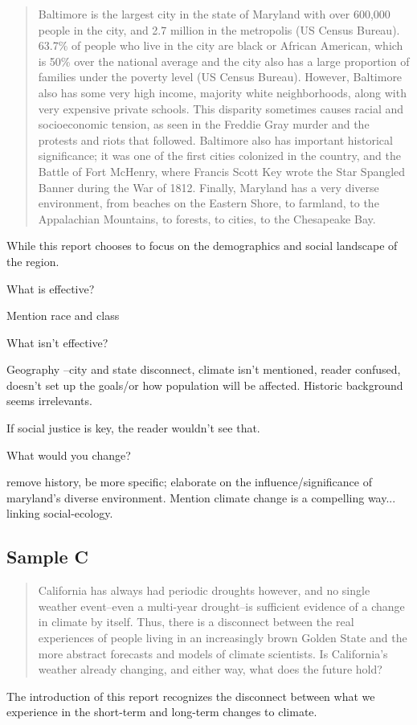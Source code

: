 \documentclass{article}\usepackage[]{graphicx}\usepackage[]{color}
\begin{document}
\begin{quote}
Baltimore is the largest city in the state of Maryland with over 600,000 people in the city, and 2.7 million in the metropolis (US Census Bureau). 63.7\% of people who live in the city are black or African American, which is 50\% over the national average and the city also has a large proportion of families under the poverty level (US Census Bureau). However, Baltimore also has some very high income, majority white neighborhoods, along with very expensive private schools. This disparity sometimes causes racial and socioeconomic tension, as seen in the Freddie Gray murder and the protests and riots that followed. Baltimore also has important historical significance; it was one of the first cities colonized in the country, and the Battle of Fort McHenry, where Francis Scott Key wrote the Star Spangled Banner during the War of 1812. Finally, Maryland has a very diverse environment, from beaches on the Eastern Shore, to farmland, to the Appalachian Mountains, to forests, to cities, to the Chesapeake Bay.
\end{quote}
While this report chooses to focus on the demographics and social landscape of the region. 

What is effective?

Mention race and class

What isn't effective?

Geography --city and state disconnect, climate isn't mentioned, reader confused, doesn't set up the goals/or how population will be affected.
Historic background seems irrelevants.

If social justice is key, the reader wouldn't see that.

What would you change?

remove history, be more specific; elaborate on the influence/significance of maryland's diverse environment. Mention climate change is a compelling way... linking social-ecology. 

\subsection{Sample C}

\begin{quote}
California has always had periodic droughts however, and no single weather event--even a multi-year drought--is sufficient evidence of a change in climate by itself. Thus, there is a disconnect between the real experiences of people living in an increasingly brown Golden State and the more abstract forecasts and models of climate scientists. Is California’s weather already changing, and either way, what does the future hold?
\end{quote}
The introduction of this report recognizes the disconnect between what we experience in the short-term and long-term changes to climate. 
\end{document}
